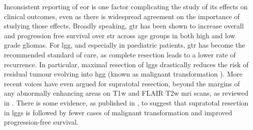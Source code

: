 Inconsistent reporting of \gls{eor} is one factor complicating the study of its effects on clinical outcomes, even as there is widespread agreement on the importance of studying those effects\autocite{Rincon-Torroella2019,Wykes2021,Weller2021}.
Broadly speaking, \gls{gtr} has been shown to increase overall and progression free survival over \gls{str} across age groups in both high \autocite{Hatoum2022, Han2020, Adams2016, McCrea2015, Bloch2012, McGirt2009, Kramm2006} and low grade \autocite{Keles2001, Pollack1995, Sanai2008} gliomas.
For \gls{lgg}, and especially in paediatric patients, \gls{gtr} has become the recommended standard of care, as complete resection leads to a lower rate of recurrence\autocite{Berger1994,Claus2005}.
In particular, maximal resection of \glspl{lgg} drastically reduces the risk of residual tumour evolving into \gls{hgg} (known as malignant transformation )\autocite{Duffau2013,Hervey-Jumper2016,Rincon-Torroella2019}.
More recent voices have even argued for supratotal resection, beyond the margins of any abnormally enhancing areas on T1w and FLAIR T2w \gls{mri} scans, as reviewed in \textcite{deLeeuw2019}.
There is some evidence, as published in \textcite{Yordanova2011}, to suggest that supratotal resection in \glspl{lgg} is followed by fewer cases of malignant transformation and improved progression-free survival. 


